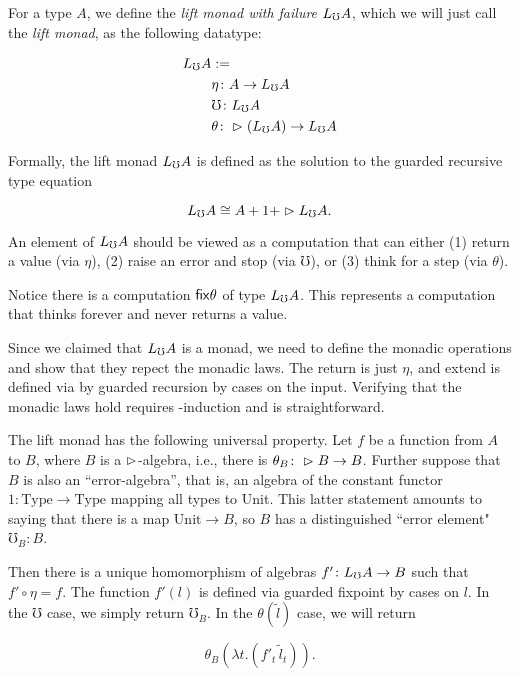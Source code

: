 \documentclass[acmsmall,screen]{acmart}
\begin{document}
For a type $A$, we define the \emph{lift monad with failure} $L_\mho A$, which we will just call
the \emph{lift monad}, as the following datatype:

\begin{align*}
  L_\mho A &:= \\
  &\eta \colon A \to L_\mho A \\
  &\mho \colon L_\mho A \\
  &\theta \colon \vartriangleright (L_\mho A) \to L_\mho A
\end{align*}

Formally, the lift monad $L_\mho A$ is defined as the solution to the guarded recursive type equation

\[ L_\mho A \cong A + 1 + \vartriangleright L_\mho A. \]

An element of $L_\mho A$ should be viewed as a computation that can either (1) return a value (via $\eta$),
(2) raise an error and stop (via $\mho$), or (3) think for a step (via $\theta$).

Notice there is a computation $\mathsf{fix} \theta$ of type $L_\mho A$. This represents a computation
that thinks forever and never returns a value.

Since we claimed that $L_\mho A$ is a monad, we need to define the monadic operations
and show that they repect the monadic laws. The return is just $\eta$, and extend
is defined via by guarded recursion by cases on the input.
%
%
Verifying that the monadic laws hold requires \lob-induction and is straightforward.

The lift monad has the following universal property. Let $f$ be a function from $A$ to $B$,
where $B$ is a $\vartriangleright$-algebra, i.e., there is $\theta_B \colon \vartriangleright B \to B$.
Further suppose that $B$ is also an ``error-algebra'', that is, an algebra of the
constant functor $1 \colon \text{Type} \to \text{Type}$ mapping all types to Unit.
This latter statement amounts to saying that there is a map $\text{Unit} \to B$, so $B$ has a
distinguished ``error element" $\mho_B \colon B$.

Then there is a unique homomorphism of algebras $f' \colon L_\mho A \to B$ such that
$f' \circ \eta = f$. The function $f'(l)$ is defined via guarded fixpoint by cases on $l$. 
In the $\mho$ case, we simply return $\mho_B$.
In the $\theta(\tilde{l})$ case, we will return

\[\theta_B (\lambda t . (f'_t \, \tilde{l}_t)). \]
\end{document}
